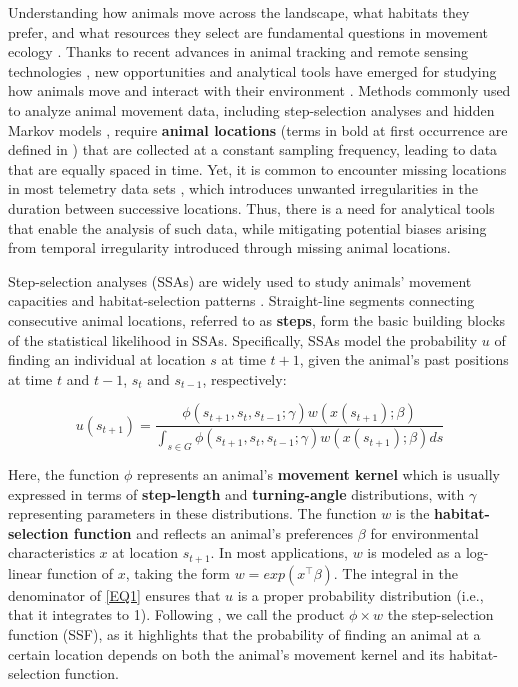 \documentclass[abstract=on,10pt,a4paper,bibliography=totocnumbered]{article}
\begin{document}
Understanding how animals move across the landscape, what habitats they prefer,
and what resources they select are fundamental questions in movement ecology
\citep{Nathan.2008}. Thanks to recent advances in animal tracking
\citep{Cagnacci.2010, Williams.2019, Beardsworth.2022} and remote sensing
technologies \citep{Toth.2016, Rumiano.2020}, new opportunities and analytical
tools have emerged for studying how animals move and interact with their
environment \citep{Tomkiewicz.2010, Kays.2015, Nathan.2022}. Methods commonly
used to analyze animal movement data, including step-selection analyses
\citep{Fortin.2005, Thurfjell.2014, Fieberg.2021} and hidden Markov models
\citep{Michelot.2016}, require \textbf{animal locations} (terms in bold at first
occurrence are defined in ) that are collected at a constant
sampling frequency, leading to data that are equally spaced in time. Yet, it is
common to encounter missing locations in most telemetry data sets
\citep{Frair.2010, Hofman.2019, Vales.2022}, which introduces unwanted
irregularities in the duration between successive locations. Thus, there is a
need for analytical tools that enable the analysis of such data, while
mitigating potential biases arising from temporal irregularity introduced
through missing animal locations.

Step-selection analyses (SSAs) are widely used to study animals' movement
capacities and habitat-selection patterns \citep{Fortin.2005, Thurfjell.2014}.
Straight-line segments connecting consecutive animal locations, referred to as
\textbf{steps}, form the basic building blocks of the statistical likelihood in
SSAs. Specifically, SSAs model the probability $u$ of finding an individual at
location $s$ at time $t+1$, given the animal's past positions at time $t$ and
$t-1$, $s_t$ and $s_{t-1}$, respectively:

\begin{equation}
\label{EQ1}
u(s_{t+1}) = \frac{\phi(s_{t+1}, s_t, s_{t-1}; \gamma)w(x(s_{t+1}); \beta)}{\int_{s \in G}\phi(s_{t+1}, s_{t}, s_{t-1}; \gamma)w(x(s_{t+1}); \beta)ds}
\end{equation}

\noindent Here, the function $\phi$ represents an animal's \textbf{movement
kernel} which is usually expressed in terms of \textbf{step-length} and
\textbf{turning-angle} distributions, with $\gamma$ representing parameters in
these distributions. The function $w$ is the \textbf{habitat-selection function}
and reflects an animal's preferences $\beta$ for environmental characteristics
$x$ at location $s_{t+1}$. In most applications, $w$ is modeled as a log-linear
function of $x$, taking the form $w = exp(x^\top\beta)$. The integral in the
denominator of \ref{EQ1} ensures that $u$ is a proper probability distribution
(i.e., that it integrates to 1). Following \citet{Michelot.2024}, we call the
product $\phi \times w$ the step-selection function (SSF), as it highlights that
the probability of finding an animal at a certain location depends on both the
animal's movement kernel and its habitat-selection function.
\end{document}
